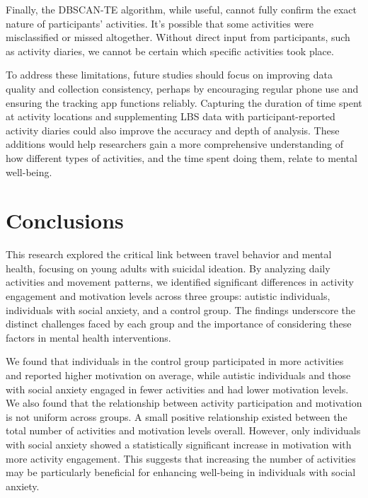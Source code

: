 \documentclass[
  letterpaper,
  number,
  review,
  3p]{elsarticle}
\begin{document}
Finally, the DBSCAN-TE algorithm, while useful, cannot fully confirm the
exact nature of participants' activities. It's possible that some
activities were misclassified or missed altogether. Without direct input
from participants, such as activity diaries, we cannot be certain which
specific activities took place.

To address these limitations, future studies should focus on improving
data quality and collection consistency, perhaps by encouraging regular
phone use and ensuring the tracking app functions reliably. Capturing
the duration of time spent at activity locations and supplementing LBS
data with participant-reported activity diaries could also improve the
accuracy and depth of analysis. These additions would help researchers
gain a more comprehensive understanding of how different types of
activities, and the time spent doing them, relate to mental well-being.


\section{Conclusions}\label{sec-conclude}

This research explored the critical link between travel behavior and
mental health, focusing on young adults with suicidal ideation. By
analyzing daily activities and movement patterns, we identified
significant differences in activity engagement and motivation levels
across three groups: autistic individuals, individuals with social
anxiety, and a control group. The findings underscore the distinct
challenges faced by each group and the importance of considering these
factors in mental health interventions.

We found that individuals in the control group participated in more
activities and reported higher motivation on average, while autistic
individuals and those with social anxiety engaged in fewer activities
and had lower motivation levels. We also found that the relationship
between activity participation and motivation is not uniform across
groups. A small positive relationship existed between the total number
of activities and motivation levels overall. However, only individuals
with social anxiety showed a statistically significant increase in
motivation with more activity engagement. This suggests that increasing
the number of activities may be particularly beneficial for enhancing
well-being in individuals with social anxiety.
\end{document}
